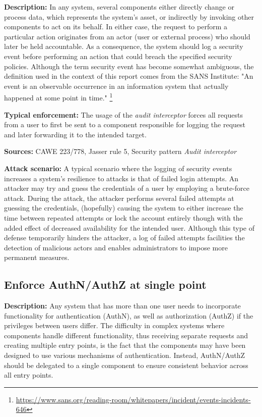 \textbf{Description:} In any system, several components either directly change or process data, which represents the system's asset, or indirectly by invoking other components to act on its behalf. In either case, the request to perform a particular action originates from an actor (user or external process) who should later be held accountable.  As a consequence, the system should log a security event before performing an action that could breach the specified security policies. Although the term security event has become somewhat ambiguous, the definition used in the context of this report comes from the SANS Institute: "An event is an observable occurrence in an information system that actually happened at some point in time." \footnote{\url{https://www.sans.org/reading-room/whitepapers/incident/events-incidents-646}}

\textbf{Typical enforcement:} The usage of the \textit{audit interceptor} forces all requests from a user to first be sent to a component responsible for logging the request and later forwarding it to the intended target. 

\textbf{Sources:} CAWE 223/778, Jasser rule 5, Security pattern \textit{Audit interceptor}

\textbf{Attack scenario:} A typical scenario where the logging of security events increases a system's resilience to attacks is that of failed login attempts. An attacker may try and guess the credentials of a user by employing a brute-force attack. During the attack, the attacker performs several failed attempts at guessing the credentials, (hopefully) causing the system to either increase the time between repeated attempts or lock the account entirely though with the added effect of decreased availability for the intended user. Although this type of defense temporarily hinders the attacker, a log of failed attempts facilities the detection of malicious actors and enables administrators to impose more permanent measures. 

\subsection{Enforce AuthN/AuthZ at single point} 
 
 \textbf{Description:} Any system that has more than one user needs to incorporate functionality for authentication (AuthN), as well as authorization (AuthZ) if the privileges between users differ. The difficulty in complex systems where components handle different functionality, thus receiving separate requests and creating multiple entry points, is the fact that the components may have been designed to use various mechanisms of authentication. Instead, AuthN/AuthZ should be delegated to a single component to ensure consistent behavior across all entry points. 
 
